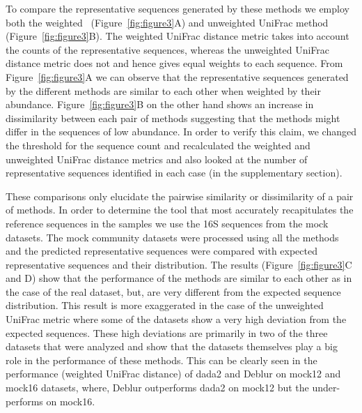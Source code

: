   To compare the representative sequences generated by these methods we employ both the weighted~\cite{Lozupone2007} (Figure~\ref{fig:figure3}A) and unweighted UniFrac method~\cite{Lozupone2005} (Figure~\ref{fig:figure3}B).
  The weighted UniFrac distance metric takes into account the counts of the representative sequences, whereas the unweighted UniFrac distance metric does not and hence gives equal weights to each sequence.
  From Figure~\ref{fig:figure3}A we can observe that the representative sequences generated by the different methods are similar to each other when weighted by their abundance.
  Figure~\ref{fig:figure3}B on the other hand shows an increase in dissimilarity between each pair of methods suggesting that the methods might differ in the sequences of low abundance.
  In order to verify this claim, we changed the threshold for the sequence count and recalculated the weighted and unweighted UniFrac distance metrics and also looked at the number of representative sequences identified in each case (in the supplementary section).


  These comparisons only elucidate the pairwise similarity or dissimilarity of a pair of methods.
  In order to determine the tool that most accurately recapitulates the reference sequences in the samples we use the 16S sequences from the mock datasets.
  The mock community datasets were processed using all the methods and the predicted representative sequences were compared with expected representative sequences and their distribution.
  The results (Figure~\ref{fig:figure3}C and D) show that the performance of the methods are similar to each other as in the case of the real dataset, but, are very different from the expected sequence distribution.
  This result is more exaggerated in the case of the unweighted UniFrac metric where some of the datasets show a very high deviation from the expected sequences.
  These high deviations are primarily in two of the three datasets that were analyzed and show that the datasets themselves play a big role in the performance of these methods.
  This can be clearly seen in the performance (weighted UniFrac distance) of \ac{dada2} and Deblur on mock12 and mock16 datasets, where, Deblur outperforms \ac{dada2} on mock12 but the under-performs on mock16.


